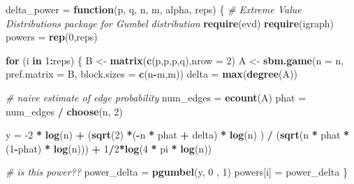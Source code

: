 \documentclass[
]{article}
\newenvironment{Shaded}{\begin{snugshade}}{\end{snugshade}}
\newcommand{\CommentTok}[1]{\textcolor[rgb]{0.56,0.35,0.01}{\textit{#1}}}
\newcommand{\ControlFlowTok}[1]{\textcolor[rgb]{0.13,0.29,0.53}{\textbf{#1}}}
\newcommand{\DataTypeTok}[1]{\textcolor[rgb]{0.13,0.29,0.53}{#1}}
\newcommand{\DecValTok}[1]{\textcolor[rgb]{0.00,0.00,0.81}{#1}}
\newcommand{\KeywordTok}[1]{\textcolor[rgb]{0.13,0.29,0.53}{\textbf{#1}}}
\newcommand{\NormalTok}[1]{#1}
\newcommand{\OperatorTok}[1]{\textcolor[rgb]{0.81,0.36,0.00}{\textbf{#1}}}
\newcommand{\StringTok}[1]{\textcolor[rgb]{0.31,0.60,0.02}{#1}}
\begin{document}
\begin{Shaded}
\begin{Highlighting}[]
\NormalTok{delta_power =}\StringTok{ }\ControlFlowTok{function}\NormalTok{(p, q, n, m, alpha, reps)}
\NormalTok{\{}
  \CommentTok{# Extreme Value Distributions package for Gumbel distribution}
  \KeywordTok{require}\NormalTok{(evd)}
  \KeywordTok{require}\NormalTok{(igraph)}
\NormalTok{  powers =}\StringTok{ }\KeywordTok{rep}\NormalTok{(}\DecValTok{0}\NormalTok{,reps)}
  

  \ControlFlowTok{for}\NormalTok{ (i }\ControlFlowTok{in} \DecValTok{1}\OperatorTok{:}\NormalTok{reps)}
\NormalTok{  \{}
\NormalTok{    B <-}\StringTok{ }\KeywordTok{matrix}\NormalTok{(}\KeywordTok{c}\NormalTok{(p,p,p,q),}\DataTypeTok{nrow =} \DecValTok{2}\NormalTok{)}
\NormalTok{    A <-}\StringTok{ }\KeywordTok{sbm.game}\NormalTok{(}\DataTypeTok{n =}\NormalTok{ n, }\DataTypeTok{pref.matrix =}\NormalTok{ B, }\DataTypeTok{block.sizes =} \KeywordTok{c}\NormalTok{(n}\OperatorTok{-}\NormalTok{m,m))}
\NormalTok{    delta =}\StringTok{ }\KeywordTok{max}\NormalTok{(}\KeywordTok{degree}\NormalTok{(A))}
      
    \CommentTok{# naive estimate of edge probability}
\NormalTok{    num_edges =}\StringTok{ }\KeywordTok{ecount}\NormalTok{(A)}
\NormalTok{    phat =}\StringTok{  }\NormalTok{num_edges }\OperatorTok{/}\StringTok{ }\KeywordTok{choose}\NormalTok{(n, }\DecValTok{2}\NormalTok{)}
    
\NormalTok{    y =}\StringTok{ }\DecValTok{-2} \OperatorTok{*}\StringTok{ }\KeywordTok{log}\NormalTok{(n) }\OperatorTok{+}\StringTok{ }\NormalTok{(}\KeywordTok{sqrt}\NormalTok{(}\DecValTok{2}\NormalTok{) }\OperatorTok{*}\NormalTok{(}\OperatorTok{-}\NormalTok{n }\OperatorTok{*}\StringTok{ }\NormalTok{phat }\OperatorTok{+}\StringTok{ }\NormalTok{delta) }\OperatorTok{*}\StringTok{ }\KeywordTok{log}\NormalTok{(n) ) }\OperatorTok{/}\StringTok{ }\NormalTok{(}\KeywordTok{sqrt}\NormalTok{(n }\OperatorTok{*}\StringTok{ }\NormalTok{phat }\OperatorTok{*}\NormalTok{(}\DecValTok{1}\OperatorTok{-}\NormalTok{phat) }\OperatorTok{*}\StringTok{ }\KeywordTok{log}\NormalTok{(n))) }\OperatorTok{+}\StringTok{ }\DecValTok{1}\OperatorTok{/}\DecValTok{2}\OperatorTok{*}\KeywordTok{log}\NormalTok{(}\DecValTok{4} \OperatorTok{*}\StringTok{ }\NormalTok{pi }\OperatorTok{*}\StringTok{ }\KeywordTok{log}\NormalTok{(n))}
    
    \CommentTok{# is this power??}
\NormalTok{    power_delta =}\StringTok{ }\KeywordTok{pgumbel}\NormalTok{(y, }\DecValTok{0}\NormalTok{ , }\DecValTok{1}\NormalTok{) }
\NormalTok{    powers[i] =}\StringTok{ }\NormalTok{power_delta}
\NormalTok{  \}}
  

\end{Highlighting}
\end{Shaded}
\end{document}
